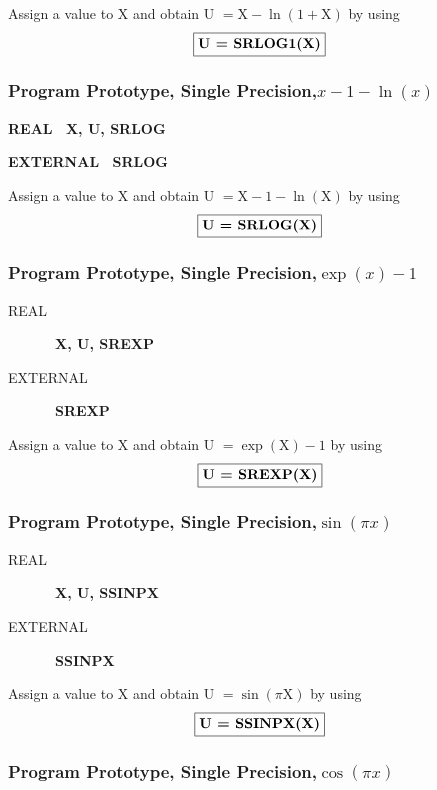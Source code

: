 \documentclass[twoside]{MATH77}
\begin{document}
Assign a value to X and obtain U $= \text{X} - \ln (1+\text{X})$ by using
$$
\fbox{\bf U = SRLOG1(X)}
$$
\subsubsection{Program Prototype, Single Precision,\newline $x - 1 - \ln (x)$}

{\bf REAL \ X, U, SRLOG}

{\bf EXTERNAL \ SRLOG}

Assign a value to X and obtain U $= \text{X} - 1 - \ln (\text{X})$ by using
$$
\fbox{\bf U = SRLOG(X)}
$$
\subsubsection{Program Prototype, Single Precision,\newline  $\exp (x) - 1$}

\begin{description}

\item[REAL] \ {\bf X, U, SREXP}

\item[EXTERNAL] \ {\bf SREXP}

\end{description}

Assign a value to X and obtain U $= \exp (\text{X}) - 1$ by using
$$
\fbox{\bf U = SREXP(X)}
$$
\subsubsection{Program Prototype, Single Precision,\newline  $\sin (\pi x)$}

\begin{description}

\item[REAL] \ {\bf  X, U, SSINPX}

\item[EXTERNAL] \ {\bf  SSINPX}

\end{description}

Assign a value to X and obtain U $= \sin (\pi \text{X})$ by using
$$
\fbox{\bf U = SSINPX(X)}
$$
\subsubsection{Program Prototype, Single Precision,\newline  $\cos (\pi x)$}
\end{document}
